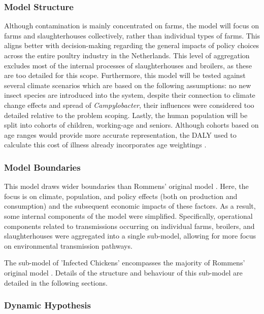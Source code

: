 \subsubsection*{Model Structure}
Although contamination is mainly concentrated on farms, the model will focus on farms and slaughterhouses collectively, rather than individual types of farms. This aligns better with decision-making regarding the general impacts of policy choices across the entire poultry industry in the Netherlands. This level of aggregation excludes most of the internal processes of slaughterhouses and broilers, as these are too detailed for this scope. Furthermore, this model will be tested against several climate scenarios which are based on the following assumptions: no new insect species are introduced into the system, despite their connection to climate change effects and spread of \textit{Campylobacter}, their influences were considered too detailed relative to the problem scoping. Lastly, the human population will be split into cohorts of children, working-age and seniors. Although cohorts based on age ranges would provide more accurate representation, the DALY used to calculate this cost of illness already incorporates age weightings \parencite{mangen_campylobacteriosis_2007}. 
\subsubsection*{Model Boundaries}

This model draws wider boundaries than Rommens' original model \parencite{rommens_infected_2020}. Here, the focus is on climate, population, and policy effects (both on production and consumption) and the subsequent economic impacts of these factors. As a result, some internal components of the model were simplified. Specifically, operational components related to transmissions occurring on individual farms, broilers, and slaughterhouses were aggregated into a single sub-model, allowing for more focus on environmental transmission pathways.

The sub-model of 'Infected Chickens' encompasses the majority of Rommens' original model \parencite{rommens_infected_2020}. Details of the structure and behaviour of this sub-model are detailed in the following sections.

\subsubsection*{Dynamic Hypothesis}

